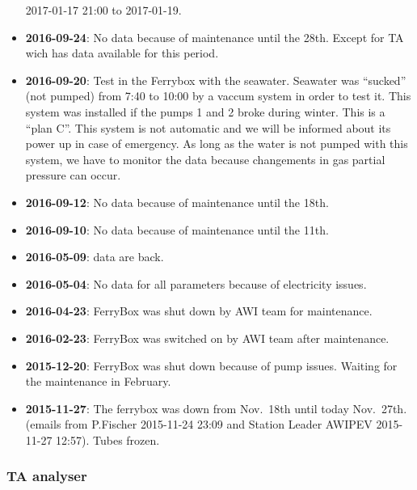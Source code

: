 \documentclass[
]{article}
\begin{document}
\begin{itemize}
  2017-01-17 21:00 to 2017-01-19.
\item
  \textbf{2016-09-24}: No data because of maintenance until the 28th.
  Except for TA wich has data available for this period.
\item
  \textbf{2016-09-20}: Test in the Ferrybox with the seawater. Seawater
  was ``sucked'' (not pumped) from 7:40 to 10:00 by a vaccum system in
  order to test it. This system was installed if the pumps 1 and 2 broke
  during winter. This is a ``plan C''. This system is not automatic and
  we will be informed about its power up in case of emergency. As long
  as the water is not pumped with this system, we have to monitor the
  data because changements in gas partial pressure can occur.
\item
  \textbf{2016-09-12}: No data because of maintenance until the 18th.
\item
  \textbf{2016-09-10}: No data because of maintenance until the 11th.
\item
  \textbf{2016-05-09}: data are back.
\item
  \textbf{2016-05-04}: No data for all parameters because of electricity
  issues.
\item
  \textbf{2016-04-23}: FerryBox was shut down by AWI team for
  maintenance.
\item
  \textbf{2016-02-23}: FerryBox was switched on by AWI team after
  maintenance.
\item
  \textbf{2015-12-20}: FerryBox was shut down because of pump issues.
  Waiting for the maintenance in February.
\item
  \textbf{2015-11-27}: The ferrybox was down from Nov.~18th until today
  Nov.~27th. (emails from P.Fischer 2015-11-24 23:09 and Station Leader
  AWIPEV 2015-11-27 12:57). Tubes frozen.
\end{itemize}

\hypertarget{ta-analyser}{%
\subsubsection{\texorpdfstring{\textbf{TA
analyser}}{TA analyser}}\label{ta-analyser}}
\end{document}
